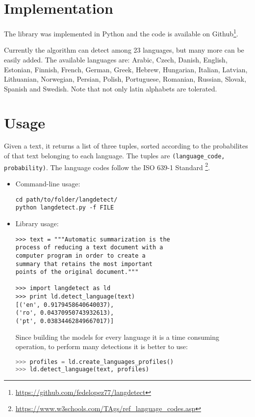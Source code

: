 \documentclass{llncs}
\begin{document}
\section{Implementation}
The library was implemented in Python and the code is available on Github\footnote{\url{https://github.com/fedelopez77/langdetect}}.

Currently the algorithm can detect among 23 languages, but many more can be easily added. The available languages are: Arabic, Czech, Danish, English, Estonian, Finnish, French, German, Greek, Hebrew, Hungarian, Italian, Latvian, Lithuanian, Norwegian, Persian, Polish, Portuguese, Romanian, Russian, Slovak, Spanish and Swedish. 
Note that not only latin alphabets are tolerated.


\section{Usage}

Given a text, it returns a list of three tuples, sorted according to the probabilites of that text belonging to each language. The tuples are \verb#(language_code, probability)#. The language codes follow the ISO 639-1 Standard \footnote{\url{https://www.w3schools.com/TAgs/ref_language_codes.asp}}.

\begin{itemize}[label={$\bullet$}]

\item Command-line usage:
\begin{lstlisting}
cd path/to/folder/langdetect/
python langdetect.py -f FILE
\end{lstlisting}


\item Library usage:

\begin{lstlisting}
>>> text = """Automatic summarization is the 
process of reducing a text document with a
computer program in order to create a 
summary that retains the most important 
points of the original document."""

>>> import langdetect as ld
>>> print ld.detect_language(text)
[('en', 0.9179458640640037), 
('ro', 0.04370950743932613), 
('pt', 0.03834462849667017)]
\end{lstlisting}

Since building the models for every language it is a time consuming operation, to perform many detections it is better to use:

\begin{lstlisting}[language=Python]
>>> profiles = ld.create_languages_profiles()
>>> ld.detect_language(text, profiles)
\end{lstlisting}

\end{itemize}
\end{document}

